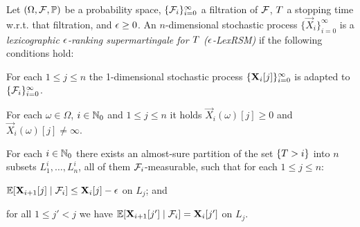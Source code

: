 \begin{definition}
Let $(\Omega,\mathcal{F},\mathbb{P})$ be a probability space, 
$\{\mathcal{F}_i\}_{i=0}^{\infty}$ a filtration of $\mathcal{F}$, $T$ a stopping 
time w.r.t. that filtration, and 
$\epsilon\geq 0$. 
An $n$-dimensional stochastic process $\{\vec{X}_{i}\}_{i=0}^{\infty}$ is a 
\emph{lexicographic $\epsilon$-ranking supermartingale for $T$ 
($\epsilon$-LexRSM)} if the 
following 
conditions hold:
\begin{compactenum}
\item For each $1\leq j \leq n$ the 1-dimensional stochastic process 
$\{\mathbf{X}_{i}[j]\}_{i=0}^{\infty}$ is adapted to 
$\{\mathcal{F}_i\}_{i=0}^{\infty}$.
\item For each $\omega \in \Omega$, $i\in \mathbb{N}_0$ and $1\leq j \leq n$ it holds 
$\vec{X}_i (\omega)[j]\geq {0}$ and $\vec{X}_i(\omega)[j]\neq \infty$.
\item For each $i\in \mathbb{N}_0$ there exists an almost-sure partition of the set $\{T>i\}$ into $n$ subsets $L^i_1,\dots,L^i_n$, all of them $\mathcal{F}_i$-measurable, such that for each $1\leq j \leq n$:
\begin{compactitem}
	\item $\mathbb{E}[\mathbf{X}_{i+1}[j]\mid 
	\mathcal{F}_i]\leq\mathbf{X}_{i}[j] - 
	\epsilon$ on $L_j$; and
	\item for all $1 \leq j' < j$ we have $\mathbb{E}[\mathbf{X}_{i+1}[j']\mid 
	\mathcal{F}_i]=\mathbf{X}_{i}[j']$ on $L_{j}$.
\end{compactitem}
\end{compactenum}
\end{definition}


